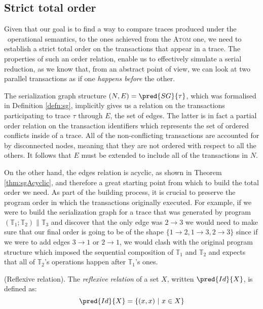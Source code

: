 \tocless\subsection{Strict total order}

Given that our goal is to find a way to compare traces produced under the \tpl\ operational semantics, to the ones achieved from the \textsc{Atom} one, we need to establish a strict total order on the transactions that appear in a trace. The properties of such an order relation, enable us to effectively simulate a serial reduction, as we know that, from an abstract point of view, we can look at two parallel transactions as if one \textit{happens before} the other.

The serialization graph structure $(N, E) = \pred{SG}{\tau}$, which was formalised in Definition \ref{defn:sg}, implicitly gives us a relation on the transactions participating to trace $\tau$ through $E$, the set of edges. The latter is in fact a partial order relation on the transaction identifiers which represents the set of ordered conflicts inside of a trace. All of the non-conflicting transactions are accounted for by disconnected nodes, meaning that they are not ordered with respect to all the others. It follows that $E$ must be extended to include all of the transactions in $N$.

On the other hand, the edges relation is acyclic, as shown in Theorem \ref{thm:sgAcyclic}, and therefore a great starting point from which to build the total order we need. As part of the building process, it is crucial to preserve the program order in which the transactions originally executed. For example, if we were to build the serialization graph for a trace that was generated by program $\left( \mathds{T}_1 ; \mathds{T}_2 \right) \| \mathds{T}_3$ and discover that the only edge was $2 \rightarrow 3$ we would need to make sure that our final order is going to be of the shape $\{ 1 \rightarrow 2, 1 \rightarrow 3, 2 \rightarrow 3 \}$ since if we were to add edges $3 \rightarrow 1$ or $2 \rightarrow 1$, we would clash with the original program structure which imposed the sequential composition of $\mathds{T}_1$ and $\mathds{T}_2$ and expects that all of $\mathds{T}_2$'s operations happen after $\mathds{T}_1$'s ones.

\begin{defn}
	(Reflexive relation).
	The \emph{reflexive relation} of a set $X$, written $\pred{Id}{X}$, is defined as:
	\[
		\pred{Id}{X} = \{ (x, x)\ |\ x \in X \}
	\]
\end{defn}

